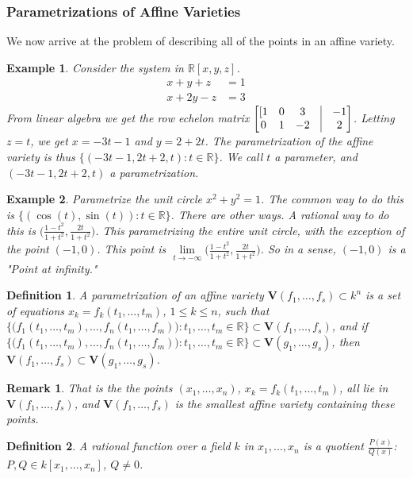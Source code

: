\documentclass[oneside]{book}
\theoremstyle{mystyle}
\newtheorem{definition}{Definition}[section]
\newtheorem{example}{Example}[section]
\newtheorem{remark}{Remark}[section]
\begin{document}
\subsubsection{Parametrizations of Affine Varieties}
We now arrive at the problem of describing all of the points in an affine variety. 
\begin{example}
Consider the system in $\mathbb{R}[x,y,z]$.
\begin{align*}
    x+y+z &= 1 \\
    x+2y-z &= 3
\end{align*}
From linear algebra we get the row echelon matrix $\begin{bmatrix}[1 & 0 & 3 & \vline & -1 \\ 0 & 1 & -2 & \vline & 2 \end{bmatrix}$. Letting $z=t$, we get $x = -3t-1$ and $y = 2+2t$. The parametrization of the affine variety is thus $\{(-3t-1,2t+2,t):t\in \mathbb{R}\}$. We call $t$ a parameter, and $(-3t-1,2t+2,t)$ a parametrization.
\end{example}
\begin{example}
Parametrize the unit circle $x^2+y^2=1$. The common way to do this is $\{(\cos(t),\sin(t)):t\in \mathbb{R}\}$. There are other ways. A rational way to do this is $\big(\frac{1-t^2}{1+t^2}, \frac{2t}{1+t^2}\big)$. This parametrizing the entire unit circle, with the exception of the point $(-1,0)$. This point is $\underset{t\rightarrow -\infty} \lim \big(\frac{1-t^2}{1+t^2},\frac{2t}{1+t^2}\big)$. So in a sense, $(-1,0)$ is a "Point at infinity."
\end{example}
\begin{definition}
A parametrization of an affine variety $\mathbf{V}(f_1,\hdots, f_s) \subset k^n$ is a set of equations $x_k = f_k(t_1,\hdots, t_m)$, $1\leq k \leq n$, such that $ \{\big(f_1(t_1,\hdots, t_m),\hdots, f_n(t_1,\hdots, f_m)\big): t_1,\hdots, t_m \in \mathbb{R}\}\subset \mathbf{V}(f_1,\hdots, f_s)$, and if $\{\big(f_1(t_1,\hdots, t_m),\hdots, f_n(t_1,\hdots, f_m)\big): t_1,\hdots, t_m \in \mathbb{R}\}\subset \mathbf{V}(g_1,\hdots, g_s)$, then $\mathbf{V}(f_1,\hdots, f_s) \subset \mathbf{V}(g_1,\hdots, g_s)$.
\end{definition}
\begin{remark}
That is the the points $(x_1,\hdots, x_n)$, $x_k = f_k(t_1,\hdots, t_m)$, all lie in $\mathbf{V}(f_1,\hdots, f_s)$, and $\mathbf{V}(f_1,\hdots, f_s)$ is the smallest affine variety containing these points.
\end{remark}
\begin{definition}
A rational function over a field $k$ in $x_1,\hdots, x_n$ is a quotient $\frac{P(x)}{Q(x)}$: $P,Q \in k[x_1,\hdots ,x_n]$, $Q\ne 0$.
\end{definition}
\end{document}
